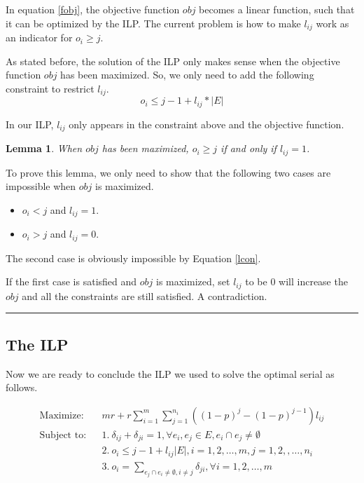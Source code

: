 \documentclass[letterpaper]{article}
\newenvironment{proof}{{Proof:}}{\hfill\rule{2mm}{2mm}}
\newtheorem{lemma}{Lemma}
\begin{document}
In equation \ref{fobj}, the objective function $obj$ becomes a linear function, such that it can be optimized by the ILP.
The current problem is how to make $l_{ij}$ work as an indicator for $o_i\geq j$.

As stated before, the solution of the ILP only makes sense when the objective function $obj$ has been maximized.
So, we only need to add the following constraint to restrict $l_{ij}$.
\begin{equation}
o_i\leq j-1+l_{ij}*|E|\label{lcon}
\end{equation}

In our ILP, $l_{ij}$ only appears in the constraint above and the objective function.

\begin{lemma}\label{lmm}
	When $obj$ has been maximized, $o_i\geq j$ if and only if $l_{ij}=1$.
\end{lemma}
\begin{proof}
	To prove this lemma, we only need to show that the following two cases are impossible when $obj$ is maximized.
	\begin{itemize}
		\item $o_i<j$ and $l_{ij}=1$.
		\item $o_i>j$ and $l_{ij}=0$.
	\end{itemize}
	The second case is obviously impossible by Equation \ref{lcon}.
	
	If the first case is satisfied and $obj$ is maximized, set $l_{ij}$ to be 0 will increase the $obj$ and all the constraints are still satisfied. A contradiction.
\end{proof}

\subsection{The ILP}
Now we are ready to conclude the ILP we used to solve the optimal serial as follows.

\begin{eqnarray}
\text{Maximize:}&& mr+r\sum_{i=1}^{m}\sum_{j=1}^{n_i}((1-p)^j-(1-p)^{j-1})l_{ij}\label{stobj}\\
\text{Subject to:}&& 1.~\delta_{ij}+\delta_{ji}=1, \forall e_i,e_j\in E, e_i\cap e_j\neq \emptyset \label{con1}\\
&& 2.~o_i\leq j-1+l_{ij}|E|,  i=1,2,\ldots,m, j=1,2,,\ldots,n_i\label{ni}\\
&& 3.~o_i=\sum_{e_j\cap e_i\neq \emptyset,i\neq j}\delta_{ji}, \forall i=1,2,\ldots,m \label{oo}
\end{eqnarray}
\end{document}
